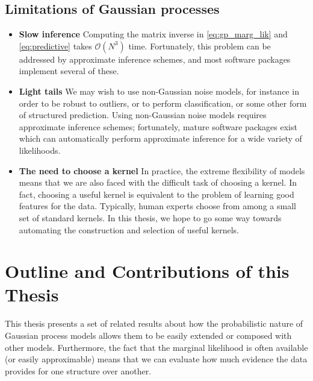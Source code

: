 \subsection{Limitations of Gaussian processes}

\begin{itemize}

\item {\bf Slow inference}
Computing the matrix inverse in \eqref{eq:gp_marg_lik} and \eqref{eq:predictive} takes $\mathcal{O}(N^3)$ time.
Fortunately, this problem can be addressed by approximate inference schemes, and most \gp{} software packages implement several of these.

\item {\bf Light tails}
We may wish to use non-Gaussian noise models, for instance in order to be robust to outliers, or to perform classification, or some other form of structured prediction.
Using non-Gaussian noise models requires approximate inference schemes; fortunately, mature software packages exist which can automatically perform approximate inference for a wide variety of likelihoods.

\item {\bf The need to choose a kernel}
In practice, the extreme flexibility of \gp{} models means that we are also faced with the difficult task of choosing a kernel.
In fact, 
choosing a useful kernel is equivalent to the problem of learning good features for the data.
Typically, human experts choose from among a small set of standard kernels.
In this thesis, we hope to go some way towards automating the construction and selection of useful kernels.
\end{itemize}





\section{Outline and Contributions of this Thesis}

This thesis presents a set of related results about how the probabilistic nature of Gaussian process models allows them to be easily extended or composed with other models.
Furthermore, the fact that the marginal likelihood is often available (or easily approximable) means that we can evaluate how much evidence the data provides for one structure over another.


